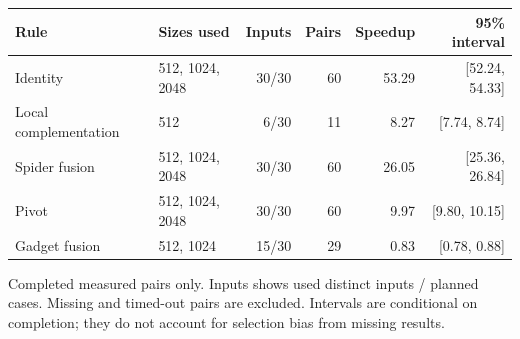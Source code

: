 \begin{tabular}{llrrrr}
\hline
Rule & Sizes used & Inputs & Pairs & Speedup & 95\% interval \\
\hline
Identity & 512, 1024, 2048 & 30/30 & 60 & 53.29 & [52.24, 54.33] \\
Local complementation & 512 & 6/30 & 11 & 8.27 & [7.74, 8.74] \\
Spider fusion & 512, 1024, 2048 & 30/30 & 60 & 26.05 & [25.36, 26.84] \\
Pivot & 512, 1024, 2048 & 30/30 & 60 & 9.97 & [9.80, 10.15] \\
Gadget fusion & 512, 1024 & 15/30 & 29 & 0.83 & [0.78, 0.88] \\
\hline
\end{tabular}
\par\smallskip\noindent Completed measured pairs only. Inputs shows used distinct inputs / planned cases. Missing and timed-out pairs are excluded. Intervals are conditional on completion; they do not account for selection bias from missing results.
